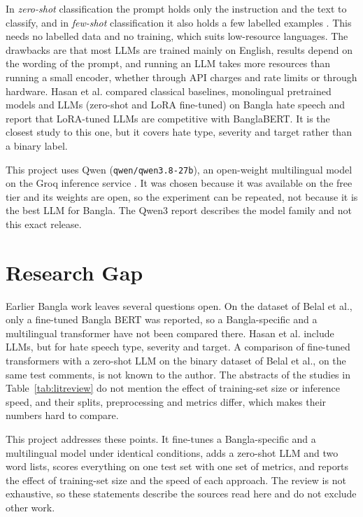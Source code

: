 In \emph{zero-shot} classification the prompt holds only the instruction and the text to classify, and in \emph{few-shot} classification it also holds a few labelled examples \cite{brown2020gpt3}. This needs no labelled data and no training, which suits low-resource languages. The drawbacks are that most LLMs are trained mainly on English, results depend on the wording of the prompt, and running an LLM takes more resources than running a small encoder, whether through API charges and rate limits or through hardware. Hasan et al. \cite{hasan2025banglamultihate} compared classical baselines, monolingual pretrained models and LLMs (zero-shot and LoRA fine-tuned) on Bangla hate speech and report that LoRA-tuned LLMs are competitive with BanglaBERT. It is the closest study to this one, but it covers hate type, severity and target rather than a binary label.

This project uses Qwen (\texttt{qwen/qwen3.8-27b}), an open-weight multilingual model on the Groq inference service \cite{groqmodels}. It was chosen because it was available on the free tier and its weights are open, so the experiment can be repeated, not because it is the best LLM for Bangla. The Qwen3 report \cite{yang2025qwen3} describes the model family and not this exact release.

\section{Research Gap}

Earlier Bangla work leaves several questions open. On the dataset of Belal et al., only a fine-tuned Bangla BERT was reported, so a Bangla-specific and a multilingual transformer have not been compared there. Hasan et al. \cite{hasan2025banglamultihate} include LLMs, but for hate speech type, severity and target. A comparison of fine-tuned transformers with a zero-shot LLM on the binary dataset of Belal et al., on the same test comments, is not known to the author. The abstracts of the studies in Table~\ref{tab:litreview} do not mention the effect of training-set size or inference speed, and their splits, preprocessing and metrics differ, which makes their numbers hard to compare.

This project addresses these points. It fine-tunes a Bangla-specific and a multilingual model under identical conditions, adds a zero-shot LLM and two word lists, scores everything on one test set with one set of metrics, and reports the effect of training-set size and the speed of each approach. The review is not exhaustive, so these statements describe the sources read here and do not exclude other work.
